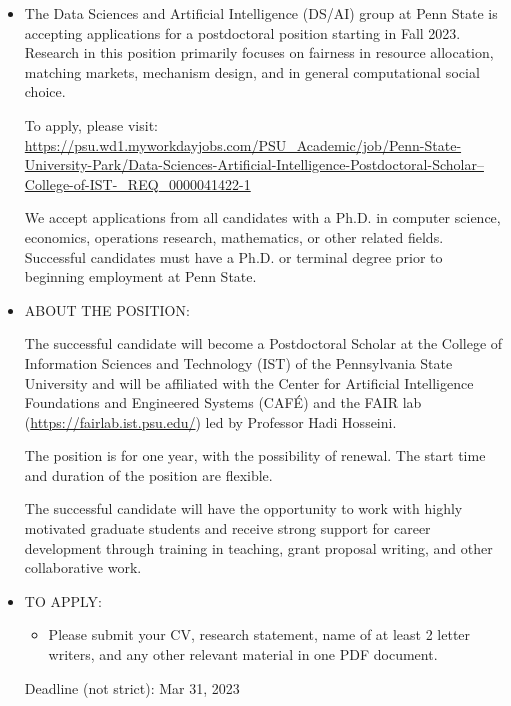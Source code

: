 \documentclass[prodmode,acmtecs]{acmsmall} %
\begin{document}
\begin{itemize}\item   The Data Sciences and Artificial Intelligence (DS/AI) group at Penn State is accepting applications for a postdoctoral position starting in Fall 2023. Research in this position primarily focuses on fairness in resource allocation, matching markets, mechanism design, and in general computational social choice.  
 
  To apply, please visit: \href{https://psu.wd1.myworkdayjobs.com/PSU_Academic/job/Penn-State-University-Park/Data-Sciences-Artificial-Intelligence-Postdoctoral-Scholar--College-of-IST-_REQ_0000041422-1}{https://psu.wd1.myworkdayjobs.com/PSU\_Academic/job/Penn-State-University-Park/Data-Sciences-Artificial-Intelligence-Postdoctoral-Scholar--College-of-IST-\_REQ\_0000041422-1} 
 
  We accept applications from all candidates with a Ph.D. in computer science, economics, operations research, mathematics, or other related fields. Successful candidates must have a Ph.D. or terminal degree prior to beginning employment at Penn State. 
 
\item  ABOUT THE POSITION: 
 
  The successful candidate will become a Postdoctoral Scholar at the College of Information Sciences and Technology (IST) of the Pennsylvania State University and will be affiliated with the Center for Artificial Intelligence Foundations and Engineered Systems (CAFÉ) and the FAIR lab (\href{https://fairlab.ist.psu.edu/}{https://fairlab.ist.psu.edu/}) led by Professor Hadi Hosseini. 
 
  The position is for one year, with the possibility of renewal. The start time and duration of the position are flexible. 
 
  The successful candidate will have the opportunity to work with highly motivated graduate students and receive strong support for career development through training in teaching, grant proposal writing, and other collaborative work. 
 
\item  TO APPLY: 
 
\begin{itemize}\item  Please submit your CV, research statement, name of at least 2 letter writers, and any other relevant material in one PDF document.
\end{itemize} 
Deadline (not strict): Mar 31, 2023 
 

\end{itemize}
\end{document}
